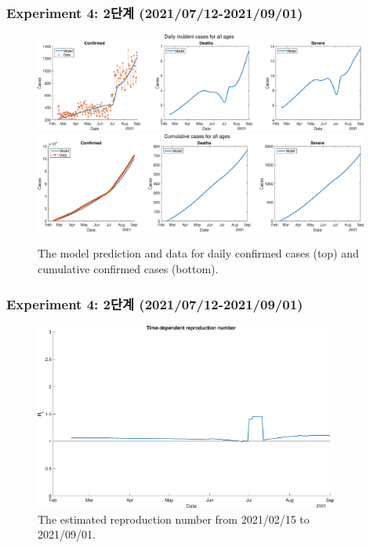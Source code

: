 \documentclass[aspectratio=169, 9pt, xcolor=dvipsnames]{beamer}
\begin{document}
	\begin{frame}\frametitle{Experiment 4: 2단계 (2021/07/12-2021/09/01)}
	    \begin{figure}
	    	\centering
	    	\includegraphics[width=11cm]{../results/estimate_sd_2nd_4/daily_all_age.eps}
	    	\includegraphics[width=11cm]{../results/estimate_sd_2nd_4/cumul_all_age.eps}
	    	\caption{The model prediction and data for daily confirmed cases (top) and cumulative confirmed cases (bottom).}
	    \end{figure}
	\end{frame}

	\begin{frame}\frametitle{Experiment 4: 2단계 (2021/07/12-2021/09/01)}
	    \begin{figure}
	    	\centering
	    	\includegraphics[width=10cm]{../results/estimate_sd_2nd_4/rep_num.eps}
	    	\caption{The estimated reproduction number from 2021/02/15 to 2021/09/01.}
	    \end{figure}
	\end{frame}
\end{document}
